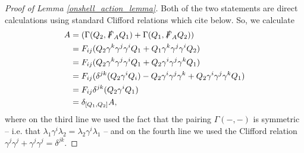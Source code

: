 \documentclass[10pt, oneside]{article}
\begin{document}
\begin{proof}[Proof of Lemma \ref{onshell_action_lemma}]
Both of the two statements are direct calculations using standard Clifford relations which cite below.
So, we calculate
\begin{align*}
[\delta_{Q_1}, \delta_{Q_2}] A &= (\Gamma(Q_2,\sd F_A Q_1) + \Gamma(Q_1,\sd F_A Q_2)) \\
&=  F_{ij}(Q_2 \gamma^k \gamma^j \gamma^i Q_1 + Q_1 \gamma^k \gamma^j \gamma^i Q_2) \\
&=  F_{ij}(Q_2 \gamma^k \gamma^j \gamma^i Q_1 + Q_2 \gamma^i \gamma^j \gamma^k Q_1)\\
&= F_{ij}(\delta^{jk}(Q_2\gamma^i Q_i) - Q_2 \gamma^i \gamma^j \gamma^k + Q_2 \gamma^i \gamma^j \gamma^k Q_1)\\
&=  F_{ij}\delta^{jk}(Q_2 \gamma^i Q_1) \\
&= \delta_{[Q_1, Q_2]} A,
\end{align*}
where on the third line we used the fact that the pairing $\Gamma(-,-)$ is symmetric -- i.e. that $\lambda_1 \gamma^i \lambda_2 = \lambda_2 \gamma^i \lambda_1$ -- and on the fourth line we used the Clifford relation $\gamma^j\gamma^j+\gamma^j\gamma^j = \delta^{jk}$.  


\end{proof}
\end{document}

